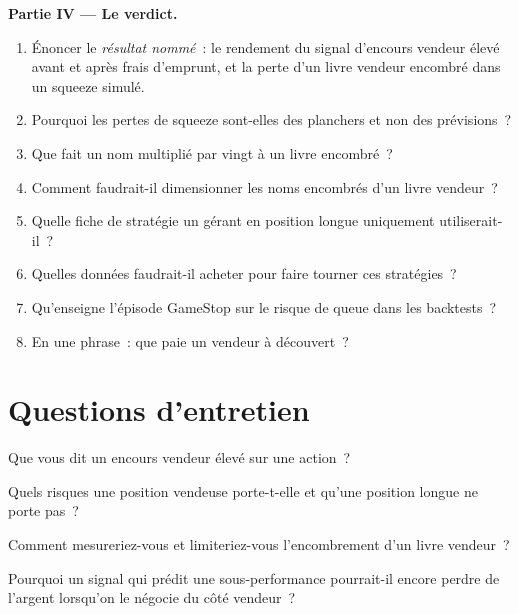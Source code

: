\begin{problem}
\medskip\noindent\textbf{Partie IV --- Le verdict.}
\begin{enumerate}[resume]
\item Énoncer le \emph{résultat nommé}~: le rendement du signal d'encours vendeur élevé avant et après frais d'emprunt, et la perte d'un livre vendeur encombré dans un
squeeze simulé.
\item Pourquoi les pertes de squeeze sont-elles des planchers et non des prévisions~?
\item Que fait un nom multiplié par vingt à un livre encombré~?
\item Comment faudrait-il dimensionner les noms encombrés d'un livre vendeur~?
\item Quelle fiche de stratégie un gérant en position longue uniquement utiliserait-il~?
\item Quelles données faudrait-il acheter pour faire tourner ces stratégies~?
\item Qu'enseigne l'épisode GameStop sur le risque de queue dans les backtests~?
\item En une phrase~: que paie un vendeur à découvert~?
\end{enumerate}
\end{problem}

\section{Questions d'entretien}

\begin{interviewq}\label{iq:s1:short-interest-borrow-and-crowding:1}
Que vous dit un encours vendeur élevé sur une action~?
\end{interviewq}

\begin{interviewq}\label{iq:s1:short-interest-borrow-and-crowding:2}
Quels risques une position vendeuse porte-t-elle et qu'une position longue ne porte pas~?
\end{interviewq}

\begin{interviewq}\label{iq:s1:short-interest-borrow-and-crowding:3}
Comment mesureriez-vous et limiteriez-vous l'encombrement d'un livre vendeur~?
\end{interviewq}

\begin{interviewq}\label{iq:s1:short-interest-borrow-and-crowding:4}
Pourquoi un signal qui prédit une sous-performance pourrait-il encore perdre de l'argent lorsqu'on le négocie du côté vendeur~?
\end{interviewq}

